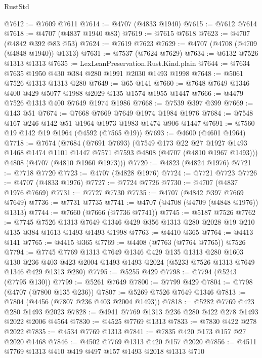 \begin{lexlean}{RustStd}
\begin{coremodule}
@7612 := @7609 @7611
@7614 := @4707 (@4833 @1940)
@7615 := @7612 @7614
@7618 := @4707 (@4837 @1940 @83)
@7619 := @7615 @7618
@7623 := @4707 (@4842 @392 @83 @53)
@7624 := @7619 @7623
@7629 := @4707 (@4708 (@4709 (@4848 @1940)) @1313)
@7631 := @7537 (@7624 @7629)
@7634 := @6132 @7526 @1313 @1313
@7635 := LexLeanPreservation.Rust.Kind.plain
@7644 := @7634 @7635 @1950 @430 @384 @280 @1991 @2030 @1493 @1998
@7648 := @5061 @7526 @1313 @1313 @280
@7649 := @65 @141
@7660 := @7648 @7649 @1346 @400 @429 @5077 @1988 @2029 @135 @1574 @1955 @1447
@7666 := @4479 @7526 @1313 @400 @7649 @1974 @1986
@7668 := @7539 @397 @399
@7669 := @143 @51
@7674 := @7668 @7669 @7649 @1974 @1984 @1976
@7684 := @7548 @167 @246 @142 @51 @1964 @1973 @1983 @1474 @906 @1447
@7691 := @7560 @19 @142 @19 @1964 (@4592 (@7565 @19))
@7693 := @4600 (@4601 @1964)
@7718 := @7674
    (@7684
      (@7691 @7693)
      (@7549
        @173
        @22
        @27
        @1927
        @1493
        @1468
        @1474
        @1101
        @1447
        @7571
        @7593
        @4808
        (@4707 (@4810 @1967 @1493)))
      @4808
      (@4707 (@4810 @1960 @1973)))
@7720 := @4823 (@4824 @1976)
@7721 := @7718 @7720
@7723 := @4707 (@4828 @1976)
@7724 := @7721 @7723
@7726 := @4707 (@4833 @1976)
@7727 := @7724 @7726
@7730 := @4707 (@4837 @1976 @7669)
@7731 := @7727 @7730
@7735 := @4707 (@4842 @397 @7669 @7649)
@7736 := @7731 @7735
@7741 := @4707 (@4708 (@4709 (@4848 @1976)) @1313)
@7744 := @7660 (@7666 (@7736 @7741))
@7745 := @5187 @7526
@7762 := @7745
    @7526
    @1313
    @7649
    @1346
    @429
    @356
    @1313
    @280
    @2028
    @19
    @210
    @135
    @384
    @1613
    @1493
    @1493
    @1998
@7763 := @4410 @365
@7764 := @4413 @141
@7765 := @4415 @365
@7769 := @4408 (@7763 (@7764 @7765)) @7526
@7794 := @7745
    @7769
    @1313
    @7649
    @1346
    @429
    @135
    @1313
    @280
    @1603
    @130
    @236
    @403
    @423
    @2004
    @1493
    @1493
    @2024
    (@5233 @7526 @1313 @7649 @1346 @429 @1313 @280)
@7795 := @5255 @429
@7798 := @7794 (@5243 (@7795 @130))
@7799 := @5261 @7649
@7800 := @7799 @429
@7804 := @7798 (@4707 (@7800 @135 @236))
@7807 := @5269 @7526 @7649 @1346
@7813 := @7804 (@4456 (@7807 @236 @403 @2004 @1493))
@7818 := @5282 @7769 @423 @280 @1493 @2023
@7828 := @4941 @7769 @1313 @236 @280 @422 @278 @1493 @2022 @2006 @4564
@7830 := @4525 @7769 @1313
@7833 := @7830 @422 @278 @2022
@7835 := @4534 @7769 @1313
@7841 := @7835 @420 @173 @157 @27 @2020 @1468
@7846 := @4502 @7769 @1313 @420 @157 @2020
@7856 := @4511 @7769 @1313 @410 @419 @497 @157 @1493 @2018 @1313 @710

\end{coremodule}
\end{lexlean}
